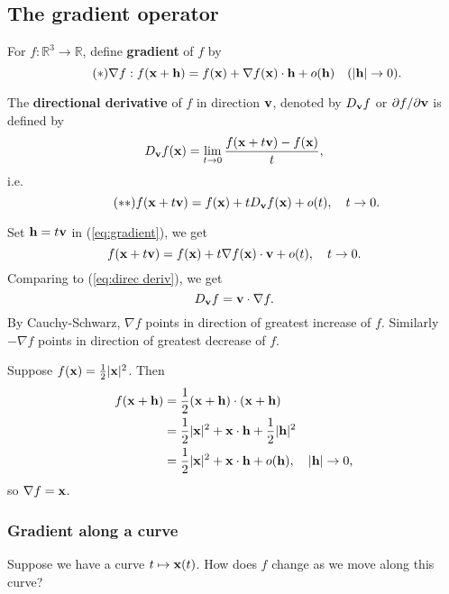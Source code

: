 \subsection{The gradient operator}
\begin{definition}[Gradient]
    For $ f: \mathbb{R}^{3}\to \mathbb{R} $, define \textbf{gradient} of $f$ by 
    \begin{equation}\label{eq:gradient}\tag{$ * $}
        \nabla f : f({\bf x}+{\bf h}) = f({\bf x})+ \nabla f({\bf x}) \cdot {\bf h}+o({\bf h})\quad (|{\bf h}|\to 0).
    \end{equation}
\end{definition}
\begin{definition}
    The \textbf{directional derivative} of $f$ in direction ${\bf v}$, denoted by $ D_{\bf v} f $ or $ \partial f/\partial {\bf v}  $ is defined by 
    \[
        D_{\bf v} f({\bf x}) = \lim_{t \to 0} \frac{f({\bf x}+t{\bf v})-f({\bf x})}{t}, 
    \]
    i.e.
    \begin{equation}\label{eq:direc deriv}\tag{$ ** $}
        f({\bf x}+t{\bf v})=f({\bf x})+t D_{\bf v} f({\bf x})+o(t),\quad t\to 0. 
    \end{equation}
\end{definition}

Set $ {\bf h}=t{\bf v} $ in (\ref{eq:gradient}), we get 
\[
    f({\bf x}+t{\bf v}) = f({\bf x})+t \nabla f({\bf x}) \cdot {\bf v} + o(t),\quad t\to 0.
\]
Comparing to (\ref{eq:direc deriv}), we get 
\[
    D_{\bf v} f = {\bf v} \cdot \nabla f.
\]
By Cauchy-Schwarz, $ \nabla f $ points in direction of greatest increase of $f$. Similarly $ - \nabla f $ points in direction of greatest decrease of $f$.

\begin{example}
    Suppose $ f({\bf x}) = \frac{1}{2}|{\bf x}|^2 $. Then 
    \begin{align*}
        f({\bf x}+{\bf h}) &= \frac{1}{2}({\bf x}+{\bf h})\cdot ({\bf x}+{\bf h})\\ 
        &= \frac{1}{2}|{\bf x}|^2+ {\bf x} \cdot {\bf h}+\frac{1}{2}|{\bf h}|^2\\ 
        &= \frac{1}{2}|{\bf x}|^2+{\bf x} \cdot {\bf h}+o({\bf h}),\quad |{\bf h}|\to 0,
    \end{align*}
    so $ \nabla f ={\bf x} $.
\end{example}

\subsubsection*{Gradient along a curve}
Suppose we have a curve $ t \mapsto {\bf x}(t) $. How does $f$ change as we move along this curve?

